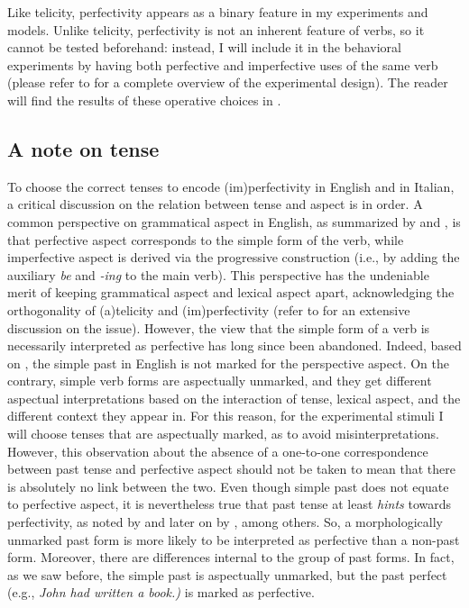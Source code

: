 Like telicity, perfectivity appears as a binary feature in my experiments and models. Unlike telicity, perfectivity is not an inherent feature of verbs, so it cannot be tested beforehand: instead, I will include it in the behavioral experiments by having both perfective and imperfective uses of the same verb (please refer to  for a complete overview of the experimental design). The reader will find the results of these operative choices in .

\subsection{A note on tense} 
To choose the correct tenses to encode (im)perfectivity in English and in Italian, a critical discussion on the relation between tense and aspect is in order. A common perspective on grammatical aspect in English, as summarized by \textcite[106]{smith1991parameter} and \textcite[663]{wagner2001aspectual}, is that perfective aspect corresponds to the simple form of the verb, while imperfective aspect is derived via the progressive construction (i.e., by adding the auxiliary \textit{be} and \textit{-ing} to the main verb). This perspective has the undeniable merit of keeping grammatical aspect and lexical aspect apart, acknowledging the orthogonality of (a)telicity and (im)perfectivity (refer to \textcite{bertinetto2001frequent} for an extensive discussion on the issue). However, the view that the simple form of a verb is necessarily interpreted as perfective has long since been abandoned. Indeed, based on \textcite{Olsen1997, bertinetto2001frequent}, the simple past in English is not marked for the perspective aspect. On the contrary, simple verb forms are aspectually unmarked, and they get different aspectual interpretations based on the interaction of tense, lexical aspect, and the different context they appear in. For this reason, for the experimental stimuli I will choose tenses that are aspectually marked, as to avoid misinterpretations.\\
However, this observation about the absence of a one-to-one correspondence between past tense and perfective aspect should not be taken to mean that there is absolutely no link between the two. Even though simple past does not equate to perfective aspect, it is nevertheless true that past tense at least \textit{hints} towards perfectivity, as noted by \textcite{comrie1976aspect} and later on by \textcite{wagner2001aspectual, Olsen1997, Medina2007}, among others. So, a morphologically unmarked past form is more likely to be interpreted as perfective than a non-past form. Moreover, there are differences internal to the group of past forms. In fact, as we saw before, the simple past is aspectually unmarked, but the past perfect (e.g., \textit{John had written a book.)} is marked as perfective.

